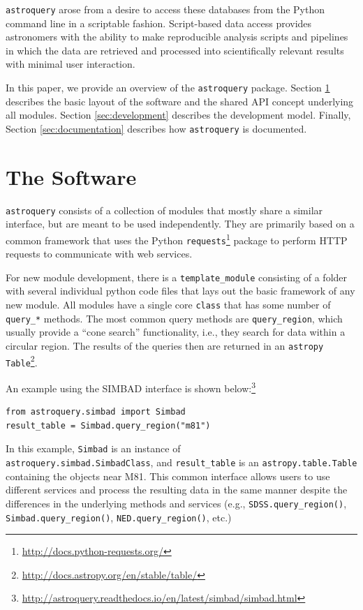 \documentclass[twocolumn]{aastex62}
\newcommand{\package}[1]{\texttt{#1}\xspace}
\newcommand{\astroquery}{\package{astroquery}}
\newcommand{\astropypkg}{\package{astropy}}
\begin{document}
\astroquery arose from a desire to access these databases from the Python
command line in a scriptable fashion.  Script-based data access provides
astronomers with the ability to make reproducible analysis scripts and
pipelines in which the data are retrieved and processed into scientifically
relevant results with minimal user interaction.

In this paper, we provide an overview of the \astroquery package.  Section
\ref{sec:software} describes the basic layout of the software and the shared
API concept underlying all modules.  Section \ref{sec:development} describes
the development model.  Finally, Section \ref{sec:documentation} describes how
\astroquery is documented.



\section{The Software}
\label{sec:software}
\astroquery consists of a collection of modules that mostly share a similar
interface, but are meant to be used independently.  They are primarily based on
a common framework that uses the Python
\package{requests}\footnote{\url{http://docs.python-requests.org/}} package to
perform HTTP requests to communicate with web services.

For new module development, there is a \texttt{template\_module} consisting of a
folder with several individual python code files that lays
out the basic framework of any new module.  All modules have a single core
\texttt{class} that has some number of \texttt{query\_*} methods.
The most common query methods are \texttt{query\_region}, which usually
provide a ``cone search'' functionality, i.e., they search for data within a
circular region. The results of
the queries then are returned in an \astropypkg
\citep{Astropy-Collaboration2018, Astropy-Collaboration2013}
\texttt{Table}\footnote{\url{http://docs.astropy.org/en/stable/table/}}.

An example using the SIMBAD interface is shown
below:\footnote{\url{http://astroquery.readthedocs.io/en/latest/simbad/simbad.html}}
\begin{lstlisting}[caption=Query SIMBAD for a region around M81]
from astroquery.simbad import Simbad
result_table = Simbad.query_region("m81")
\end{lstlisting}
In this example, \texttt{Simbad} is an instance of \\
\texttt{astroquery.simbad.SimbadClass}, and \texttt{result\_table} is an
\texttt{astropy.table.Table} containing the objects near M81.
This common interface allows users to use different services and process
the resulting data in the same manner despite the differences in the underlying
methods and services (e.g., \texttt{SDSS.query\_region()},
\texttt{Simbad.query\_region()}, \texttt{NED.query\_region()}, etc.) 
\end{document}
